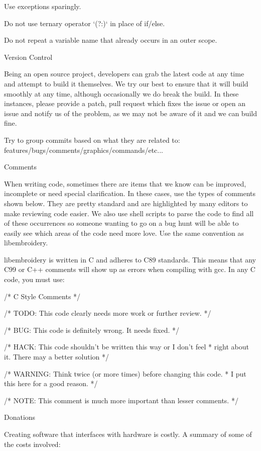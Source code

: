 \documentclass[a4paper]{report}
\begin{document}
Use exceptions sparingly.

Do not use ternary operator `(?:)` in place of if/else.

Do not repeat a variable name that already occurs in an outer scope.

Version Control
~~~~~~~~~~~~~~~

Being an open source project, developers can grab the latest code at any time
and attempt to build it themselves. We try our best to ensure that it will build smoothly
at any time, although occasionally we do break the build. In these instances,
please provide a patch, pull request which fixes the issue or open an issue and
notify us of the problem, as we may not be aware of it and we can build fine.

Try to group commits based on what they are related to: features/bugs/comments/graphics/commands/etc...

Comments
~~~~~~~~

When writing code, sometimes there are items that we know can be improved,
incomplete or need special clarification. In these cases, use the types of
comments shown below. They are pretty standard and are highlighted by many editors to
make reviewing code easier. We also use shell scripts to parse the code to find
all of these occurrences so someone wanting to go on a bug hunt will be able to
easily see which areas of the code need more love. Use the same convention
as libembroidery.

libembroidery is written in C and adheres to C89 standards. This means
that any C99 or C++ comments will show up as errors when compiling with
gcc. In any C code, you must use:

    /* C Style Comments */

    /* TODO: This code clearly needs more work or further review. */

    /* BUG: This code is definitely wrong. It needs fixed. */

    /* HACK: This code shouldn't be written this way or I don't feel
      * right about it. There may a better solution */

    /* WARNING: Think twice (or more times) before changing this code.
     * I put this here for a good reason. */

    /* NOTE: This comment is much more important than lesser comments. */

Donations
~~~~~~~~~

Creating software that interfaces with hardware is costly. A summary
of some of the costs involved:
\end{document}
